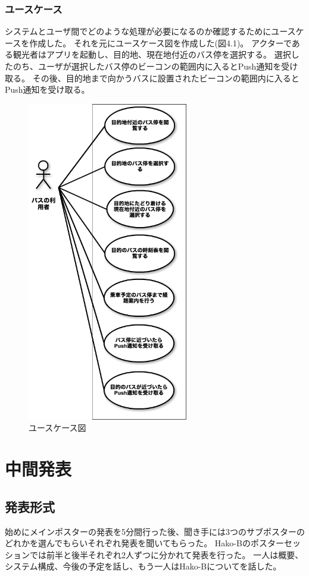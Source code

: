 \documentclass[openany,11pt,papersize]{jsbook}
\begin{document}

\subsection{ユースケース}
システムとユーザ間でどのような処理が必要になるのか確認するためにユースケースを作成した。
それを元にユースケース図を作成した(図4.1)。
アクターである観光者はアプリを起動し、目的地、現在地付近のバス停を選択する。
選択したのち、ユーザが選択したバス停のビーコンの範囲内に入るとPush通知を受け取る。
その後、目的地まで向かうバスに設置されたビーコンの範囲内に入るとPush通知を受け取る。

\begin{figure}[htbp]
  \begin{center}
    \includegraphics[clip,width=7.0cm]{img/usecase.png}
    \caption{ユースケース図}
    \label{fig:usecase}
  \end{center}
\end{figure}


\chapter{中間発表}

\section{発表形式}
始めにメインポスターの発表を5分間行った後、聞き手には3つのサブポスターのどれかを選んでもらいそれぞれ発表を聞いてもらった。
Hako-Bのポスターセッションでは前半と後半それぞれ2人ずつに分かれて発表を行った。
一人は概要、システム構成、今後の予定を話し、もう一人はHako-Bについてを話した。
\end{document}
